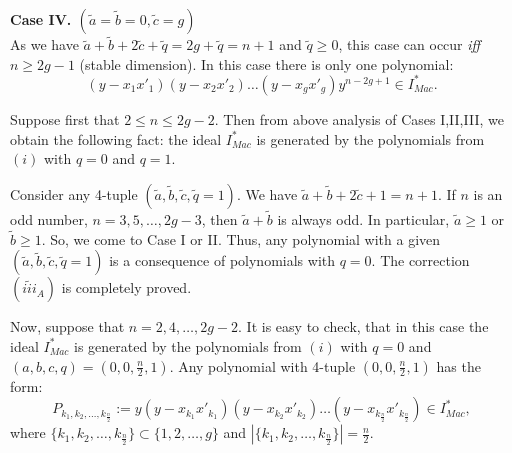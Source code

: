 \documentclass[a4paper,14pt]{article}
\begin{document}
{\bf Case IV. $(\tilde{a} = \tilde{b} = 0, \tilde{c} = g)$}\\ 
As we have $\tilde{a} + \tilde{b} + 2\tilde{c} + \tilde{q} = 2g + \tilde{q} = n+1$ and $\tilde{q}\ge 0$, this case can occur {\it iff} $n\ge 2g-1$ (stable dimension). In this case there is only one polynomial:
$$
(y - x_1x'_1)(y - x_2x'_2)\ldots (y - x_g x'_g) y^{n-2g+1} \in I^*_{Mac}.
$$

Suppose first that $2\le n\le 2g-2$. Then from above analysis of Cases I,II,III, we obtain the following fact: the ideal $I^*_{Mac}$ is generated by the polynomials from $(i)$ with $q=0$ and $q=1$. 

Consider any 4-tuple $(\tilde{a},\tilde{b},\tilde{c},\tilde{q}=1)$. We have $\tilde{a} + \tilde{b} + 2\tilde{c} + 1 = n+1$. If $n$ is an odd number, $n=3,5,\ldots,2g-3$, then $\tilde{a} + \tilde{b}$ is always odd. In particular, $\tilde{a}\ge 1$ or $\tilde{b}\ge 1$. So, we come to Case I or II. Thus, any polynomial with a given $(\tilde{a},\tilde{b},\tilde{c},\tilde{q}=1)$ is a consequence of polynomials with $q=0$. The correction $(\widetilde{iii}_A)$ is completely proved.

Now, suppose that $n=2,4,\ldots,2g-2$. It is easy to check, that in this case the ideal $I^*_{Mac}$ is generated by the polynomials from $(i)$ with $q=0$ and $(a,b,c,q)=(0,0,\frac{n}{2},1)$. Any polynomial with 4-tuple $(0,0,\frac{n}{2},1)$ has the form:
$$
P_{k_1,k_2,\ldots,k_{\frac{n}{2}}} := y (y-x_{k_1}x'_{k_1}) (y-x_{k_2}x'_{k_2})\ldots (y-x_{k_{\frac{n}{2}}}x'_{k_{\frac{n}{2}}}) \in I^*_{Mac},
$$
where $\{ k_1,k_2,\ldots,k_{\frac{n}{2}} \} \subset \{1,2,\ldots,g\} $ and $|\{ k_1,k_2,\ldots,k_{\frac{n}{2}} \}| = \frac{n}{2}$.
\end{document}
